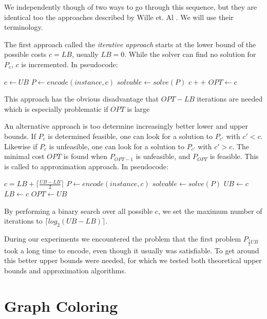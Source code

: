 \documentclass{sig-alternate}
\newcommand{\mli}[1]{\mathit{#1}}
\begin{document}
We independently though of two ways to go through this sequence, but they are identical too the approaches described by Wille et. Al \cite{wille2008using}.
We will use their terminology.

The first approach called the \emph{iterative approach} starts at the lower bound of the possible costs $c = \mli{LB}$, usually $\mli{LB} = 0$.
While the solver can find no solution for $P_c$, $c$ is incremented.
In pseudocode:

\begin{algorithmic}
\State $c \gets \mli{UB}$
	\State $P \gets encode(instance, c)$
	\State $solvable \gets solve(P)$
		\State $c++$
	\EndIf
\EndWhile
\State $\mli{OPT} \gets c$
\end{algorithmic}

This approach has the obvious disadvantage that $\mli{OPT}-\mli{LB}$ iterations are needed which is especially problematic if $\mli{OPT}$ is large

An alternative approach is too determine increasingly better lower and upper bounds.
If $P_c$ is determined feasible, one can look for a solution to $P_{c'}$ with $c' < c$. Likewise if $P_c$ is unfeasible, one can look for a solution to $P_{c'}$ with $c' > c$.
The minimal cost $OPT$ is found when $P_{OPT-1}$ is unfeasible, and $P_{\mli{OPT}}$ is feasible. This is called to approximation approach.
In pseudocode:

\begin{algorithmic}
\While {$\mli{LB} \neq \mli{UB} - 1$}
	\State $c = \mli{LB} + \lceil \frac{\mli{UB} - \mli{LB}}{2} \rceil$
	\State $P \gets encode(instance, c)$
	\State $solvable \gets solve(P)$
		\State $\mli{UB} \gets c$
	\Else
		\State $\mli{LB} \gets c$
	\EndIf
\EndWhile
\State $\mli{OPT} \gets \mli{UB}$
\end{algorithmic}

By performing a binary search over all possible $c$, we set the maximum number of iterations to $\lceil log_2(\mli{UB}-\mli{LB}) \rceil$.

During our experiments we encountered the problem that the first problem $P_{\frac{1}{2}\mli{UB}}$ took a long time to encode, even though it usually was satisfiable.
To get around this better upper bounds were needed, for which we tested both theoretical upper bounds and approximation algorithms.


\section{Graph Coloring}
\end{document}
